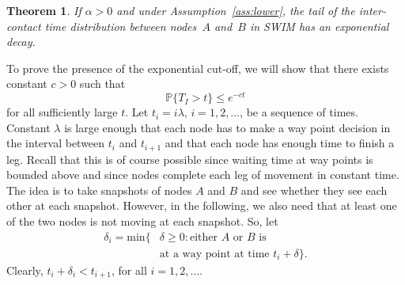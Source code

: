 \documentclass[conference]{IEEEtran}
\newtheorem{theorem}{Theorem}
\begin{document}
\begin{theorem}
If $\alpha>0$ and under Assumption~\ref{ass:lower}, \emph{the tail} of the
inter-contact time distribution between nodes~$A$ and~$B$ in SWIM has an
exponential decay.
\end{theorem}
\begin{IEEEproof}
To prove the presence of the exponential cut-off, we will show that there exists
constant $c>0$ such that
\begin{equation*}
\mathbb{P}\{T_I>t\}\le e^{-ct}
\end{equation*}
for all sufficiently large $t$. Let $t_i=i\lambda$, $i=1,2,\dotsc$, be
a sequence of times. Constant $\lambda$ is large enough that each node has
to make a way point decision in the interval between $t_i$ and $t_{i+1}$
and that each node has enough time to finish a leg. Recall that this is of
course possible since waiting time at way points is bounded above and since
nodes complete each leg of movement in constant time. The idea is to take
snapshots of nodes $A$ and $B$ and see whether they see each other at each
snapshot. However, in the following, we also need that at least one of the two
nodes is not moving at each snapshot. So, let
\begin{equation*}
\begin{split}
\delta_i=\text{min}\{ & \delta\ge 0 : \text{either $A$ or $B$ is}\\
& \text{at a way point at time $t_i+\delta$}\}.
\end{split}
\end{equation*}
Clearly, $t_i+\delta_i<t_{i+1}$, for all $i=1,2,\dotsc$.


\end{IEEEproof}
\end{document}
